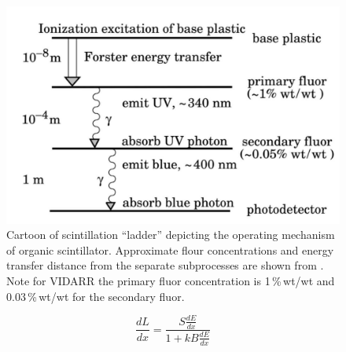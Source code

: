 \begin{figure}[!h]
  \centering
  \includegraphics[width=0.5\linewidth]{Chapter4/Figs/SmartSelect_20220902-153757_Noteshelf.jpg}
  \caption[Cartoon of scintillation ``ladder'' depicting the operating mechanism of organic scintillator.]{Cartoon of scintillation ``ladder'' depicting the operating mechanism of organic scintillator. Approximate flour concentrations and energy transfer distance from the separate subprocesses are shown from \cite{Zyla_pdg_2020}. Note for VIDARR the primary fluor concentration is 1\,\%\,wt/wt and 0.03\,\%\,wt/wt for the secondary fluor.}
  \label{fig:scintillationLadder}
\end{figure}

\begin{equation}
\frac{dL}{dx} = \frac{S\frac{dE}{dx}}{1 + kB \frac{dE}{dx}}
\label{equ:Birks_formula}
\end{equation}


